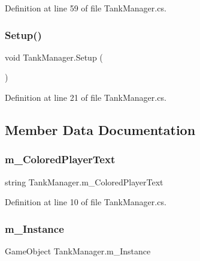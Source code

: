 Definition at line 59 of file Tank\+Manager.\+cs.

\mbox{\label{class_tank_manager_adfea056ff87cf9e231b8517424523587}} 
\subsubsection{\texorpdfstring{Setup()}{Setup()}}
{\footnotesize\ttfamily void Tank\+Manager.\+Setup (\begin{DoxyParamCaption}{ }\end{DoxyParamCaption})}



Definition at line 21 of file Tank\+Manager.\+cs.



\subsection{Member Data Documentation}
\mbox{\label{class_tank_manager_a57aeeff3cac93ea8ea026a41271e60a0}} 
\subsubsection{\texorpdfstring{m\+\_\+\+Colored\+Player\+Text}{m\_ColoredPlayerText}}
{\footnotesize\ttfamily string Tank\+Manager.\+m\+\_\+\+Colored\+Player\+Text}



Definition at line 10 of file Tank\+Manager.\+cs.

\mbox{\label{class_tank_manager_a16fe43d5057c1b812638a89fde1aa225}} 
\subsubsection{\texorpdfstring{m\+\_\+\+Instance}{m\_Instance}}
{\footnotesize\ttfamily Game\+Object Tank\+Manager.\+m\+\_\+\+Instance}



